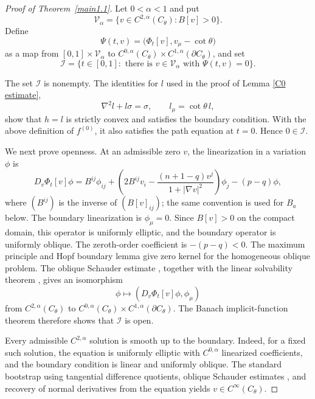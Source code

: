 \documentclass[11pt]{amsart}
\numberwithin{equation} {section}
\numberwithin{equation}{section}
\begin{document}
\begin{proof}[Proof of Theorem~\ref{main1.1}]
Let $0<\alpha<1$ and put
\[
        \mathcal V_{\alpha}
        =\{v\in C^{2,\alpha}(C_{\theta}): B[v]>0\}.
\]
Define
\[
        \Psi(t,v)=\bigl(\Phi_t[v],v_{\mu}-\cot\theta\bigr)
\]
as a map from $[0,1]\times\mathcal V_{\alpha}$ to
$C^{0,\alpha}(C_{\theta})\times C^{1,\alpha}(\partial C_{\theta})$, and set
\[
        \mathcal I
        =\{t\in[0,1]:\text{ there is }v\in\mathcal V_{\alpha}
        \text{ with }\Psi(t,v)=0\}.
\]

The set $\mathcal I$ is nonempty. The identities for $l$ used in the proof of
Lemma \ref{C0 estimate},
\[
        \nabla^2l+l\sigma=\sigma,\qquad
        l_{\mu}=\cot\theta\,l,
\]
show that $h=l$ is strictly convex and satisfies the boundary condition. With
the above definition of $f^{(0)}$, it also satisfies the path equation at
$t=0$. Hence $0\in\mathcal I$.

We next prove openness. At an admissible zero $v$, the linearization in a
variation $\phi$ is
\begin{equation}\label{linearized log}
        D_v\Phi_t[v]\phi
        =B^{ij}\phi_{ij}
        +\left(2B^{ij}v_i
        -\frac{(n+1-q)v^j}{1+|\nabla v|^2}\right)\phi_j
        -(p-q)\phi,
\end{equation}
where $(B^{ij})$ is the inverse of $(B[v]_{ij})$; the same convention is used
for $B_a$ below. The boundary linearization is $\phi_{\mu}=0$.
Since $B[v]>0$ on the compact domain, this operator is uniformly elliptic, and the boundary operator is uniformly
oblique. The zeroth-order coefficient is $-(p-q)<0$. The maximum principle and
Hopf boundary lemma \cite[Lemma~3.4 and Theorem~3.5]{GT83} give zero kernel for
the homogeneous oblique problem. The oblique Schauder estimate
\cite[Theorem~6.30]{GT83}, together with the linear solvability theorem
\cite[Theorem~6.31]{GT83}, gives an isomorphism
\[
        \phi\mapsto (D_v\Phi_t[v]\phi,\phi_{\mu})
\]
from $C^{2,\alpha}(C_{\theta})$ to
$C^{0,\alpha}(C_{\theta})\times C^{1,\alpha}(\partial C_{\theta})$. The Banach
implicit-function theorem therefore shows that $\mathcal I$ is open.

Every admissible $C^{2,\alpha}$ solution is smooth up to the
boundary. Indeed, for a fixed such solution, the equation is
uniformly elliptic with $C^{0,\alpha}$ linearized coefficients,
and the boundary condition is linear and uniformly oblique.
The standard bootstrap using tangential difference quotients,
oblique Schauder estimates \cite[Section~6.7]{GT83}, and
recovery of normal derivatives from the equation yields
$v\in C^\infty(C_{\theta})$.


\end{proof}
\end{document}
